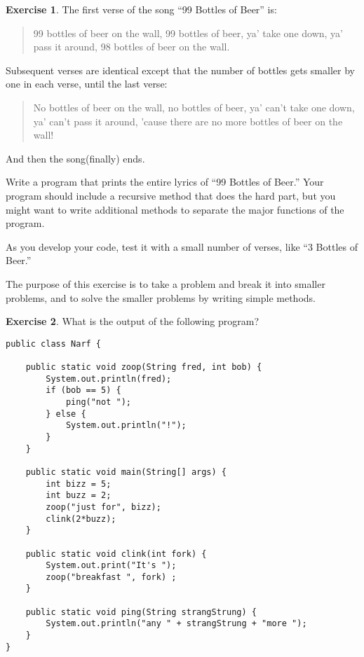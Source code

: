 \documentclass[12pt]{book}
\theoremstyle{definition}
\newtheorem{excz}{Exercise}[chapter]
\newenvironment{exercise}{\bigskip\begin{excz}\mbox{}}{\end{excz}}
\begin{document}
\begin{exercise}

The first verse of the song ``99 Bottles of Beer'' is:

\begin{quote}
99 bottles of beer on the wall,
99 bottles of beer,
ya' take one down, ya' pass it around,
98 bottles of beer on the wall.
\end{quote}

Subsequent verses are identical except that the number
of bottles gets smaller by one in each verse, until the
last verse:

\begin{quote}
No bottles of beer on the wall,
no bottles of beer,
ya' can't take one down, ya' can't pass it around,
'cause there are no more bottles of beer on the wall!
\end{quote}
%
And then the song(finally) ends.

Write a program that prints the entire lyrics of
``99 Bottles of Beer.''  Your program should include a
recursive method that does the hard part, but you
might want to write additional methods to separate the major
functions of the program.

As you develop your code, test it with a small number of
verses, like ``3 Bottles of Beer.''

The purpose of this exercise is to take a problem and break it
into smaller problems, and to solve the smaller problems by writing
simple methods.
\end{exercise}

\begin{exercise}

What is the output of the following program?

\begin{lstlisting}
public class Narf {

    public static void zoop(String fred, int bob) {
        System.out.println(fred);
        if (bob == 5) {
            ping("not ");
        } else {
            System.out.println("!");
        }
    }

    public static void main(String[] args) {
        int bizz = 5;
        int buzz = 2;
        zoop("just for", bizz);
        clink(2*buzz);
    }

    public static void clink(int fork) {
        System.out.print("It's ");
        zoop("breakfast ", fork) ;
    }

    public static void ping(String strangStrung) {
        System.out.println("any " + strangStrung + "more ");
    }
}
\end{lstlisting}
\end{exercise}
\end{document}
